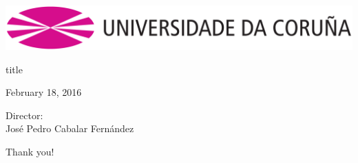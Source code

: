 \documentclass[english,handout]{beamer}
\newcommand{\director}{
\begin{small}
Director:\\José Pedro Cabalar Fernández
\end{small}
}
\begin{document}
\begin{frame}
\centering
\vfill
\includegraphics[width=0.6\linewidth]{imagenes/anagramaUDC.png}
\vfill
\begin{beamercolorbox}[rounded=true,shadow=true,sep=8pt,center]{title}
\inserttitle \par
\end{beamercolorbox}
\vfill
\centering
\insertauthor
\vfill
February 18, 2016\par
\begin{center}
\director \par 
\vfill
\alert{Thank you!}
\end{center}
\end{frame}
\end{document}
